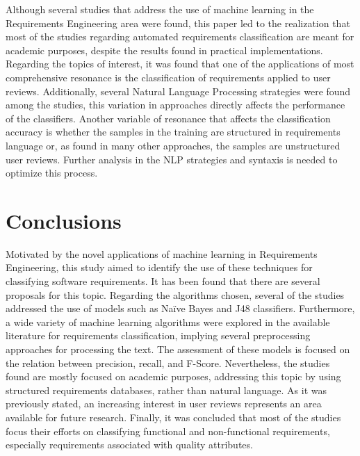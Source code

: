 \documentclass[conference]{IEEEtran}
\begin{document}
Although several studies that address the use of machine learning in the Requirements Engineering area were found, this paper led to the realization that most of the studies regarding automated requirements classification are meant for academic purposes, despite the results found in practical implementations. Regarding the topics of interest, it was found that one of the applications of most comprehensive resonance is the classification of requirements applied to user reviews. 
Additionally, several Natural Language Processing strategies were found among the studies, this variation in approaches directly affects the performance of the classifiers. Another variable of resonance that affects the classification accuracy is whether the samples in the training are structured in requirements language or, as found in many other approaches, the samples are unstructured user reviews. Further analysis in the NLP strategies and syntaxis is needed to optimize this process.

\section{Conclusions}
\label{conclusions}

Motivated by the novel applications of machine learning in Requirements Engineering, this study aimed to identify the use of these techniques for classifying software requirements. It has been found that there are several proposals for this topic. Regarding the algorithms chosen, several of the studies addressed the use of models such as Naïve Bayes and J48 classifiers. Furthermore, a wide variety of machine learning algorithms were explored in the available literature for requirements classification, implying several preprocessing approaches for processing the text. The assessment of these models is focused on the relation between precision, recall, and F-Score. Nevertheless, the studies found are mostly focused on academic purposes, addressing this topic by using structured requirements databases, rather than natural language. As it was previously stated, an increasing interest in user reviews represents an area available for future research. Finally, it was concluded that most of the studies focus their efforts on classifying functional and non-functional requirements, especially requirements associated with quality attributes.



\end{document}
